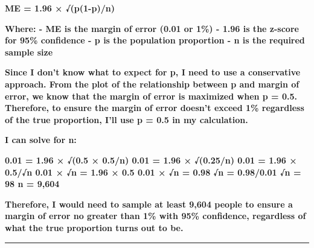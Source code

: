 \documentclass[
]{article}
\begin{document}
\textbf{ME = 1.96 × √(p(1-p)/n)}

\textbf{Where: - ME is the margin of error (0.01 or 1\%) - 1.96 is the
z-score for 95\% confidence - p is the population proportion - n is the
required sample size}

\textbf{Since I don't know what to expect for p, I need to use a
conservative approach. From the plot of the relationship between p and
margin of error, we know that the margin of error is maximized when p =
0.5. Therefore, to ensure the margin of error doesn't exceed 1\%
regardless of the true proportion, I'll use p = 0.5 in my calculation.}

\textbf{I can solve for n:}

\textbf{0.01 = 1.96 × √(0.5 × 0.5/n) 0.01 = 1.96 × √(0.25/n) 0.01 = 1.96
× 0.5/√n 0.01 × √n = 1.96 × 0.5 0.01 × √n = 0.98 √n = 0.98/0.01 √n = 98
n = 9,604}

\textbf{Therefore, I would need to sample at least 9,604 people to
ensure a margin of error no greater than 1\% with 95\% confidence,
regardless of what the true proportion turns out to be.}

\begin{center}\rule{0.5\linewidth}{0.5pt}\end{center}
\end{document}

